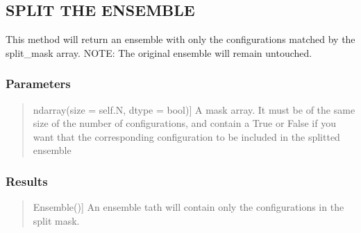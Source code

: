 \documentclass[a4paper,11pt,english]{sphinxmanual}
\begin{document}
\begin{fulllineitems}

\begin{fulllineitems}
\label{\detokenize{apireference:sscha.Ensemble.Ensemble.split}}
\pysigstartsignatures
{}
\pysigstopsignatures

\subsection{SPLIT THE ENSEMBLE}
\label{\detokenize{apireference:split-the-ensemble}}
\sphinxAtStartPar
This method will return an ensemble with only the configurations matched by the split\_mask array.
NOTE: The original ensemble will remain untouched.


\subsubsection{Parameters}
\label{\detokenize{apireference:id27}}\begin{quote}
\begin{description}
\sphinxlineitem{split\_mask}{[}ndarray(size = self.N, dtype = bool){]}
\sphinxAtStartPar
A mask array. It must be of the same size of the number of configurations,
and contain a True or False if you want that the corresponding configuration to be included in the
splitted ensemble

\end{description}
\end{quote}


\subsubsection{Results}
\label{\detokenize{apireference:id28}}\begin{quote}
\begin{description}
\sphinxlineitem{splitted\_ensemble}{[}Ensemble(){]}
\sphinxAtStartPar
An ensemble tath will contain only the configurations in the split mask.

\end{description}
\end{quote}

\end{fulllineitems}



\end{fulllineitems}
\end{document}
